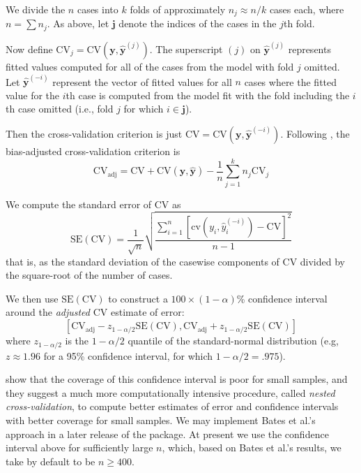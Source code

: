 \documentclass[
]{jss}
\begin{document}
We divide the \(n\) cases into \(k\) folds of approximately
\(n_j \approx n/k\) cases each, where \(n = \sum n_j\). As above, let
\(\mathbf{j}\) denote the indices of the cases in the \(j\)th fold.

Now define
\(\mathrm{CV}_j = \mathrm{CV}(\mathbf{y}, \widehat{\mathbf{y}}^{(j)})\).
The superscript \((j)\) on \(\widehat{\mathbf{y}}^{(j)}\) represents
fitted values computed for all of the cases from the model with fold
\(j\) omitted. Let \(\widehat{\mathbf{y}}^{(-i)}\) represent the vector
of fitted values for all \(n\) cases where the fitted value for the
\(i\)th case is computed from the model fit with the fold including the
\(i\)th case omitted (i.e., fold \(j\) for which \(i \in \mathbf{j}\)).

Then the cross-validation criterion is just
\(\mathrm{CV} = \mathrm{CV}(\mathbf{y}, \widehat{\mathbf{y}}^{(-i)})\).
Following \citet[pp.~293--295]{DavisonHinkley:1997}, the bias-adjusted
cross-validation criterion is \[
\mathrm{CV}_{\mathrm{adj}} = \mathrm{CV} + \mathrm{CV}(\mathbf{y}, \widehat{\mathbf{y}}) - \frac{1}{n} \sum_{j=1}^{k} n_j \mathrm{CV}_j
\]

We compute the standard error of CV as \[
\mathrm{SE}(\mathrm{CV}) = \frac{1}{\sqrt n} \sqrt{ \frac{\sum_{i=1}^n \left[ \mathrm{cv}(y_i, \widehat{y}_i^{(-i)} ) - \mathrm{CV} \right]^2 }{n - 1} }
\] that is, as the standard deviation of the casewise components of CV
divided by the square-root of the number of cases.

We then use \(\mathrm{SE}(\mathrm{CV})\) to construct a
\(100 \times (1 - \alpha)\)\% confidence interval around the
\emph{adjusted} CV estimate of error: \[
\left[ \mathrm{CV}_{\mathrm{adj}} - z_{1 - \alpha/2}\mathrm{SE}(\mathrm{CV}), \mathrm{CV}_{\mathrm{adj}} + z_{1 - \alpha/2}\mathrm{SE}(\mathrm{CV})  \right]
\] where \(z_{1 - \alpha/2}\) is the \(1 - \alpha/2\) quantile of the
standard-normal distribution (e.g, \(z \approx 1.96\) for a 95\%
confidence interval, for which \(1 - \alpha/2 = .975\)).

\citet{BatesHastieTibshirani:2023} show that the coverage of this
confidence interval is poor for small samples, and they suggest a much
more computationally intensive procedure, called \emph{nested
cross-validation}, to compute better estimates of error and confidence
intervals with better coverage for small samples. We may implement Bates
et al.'s approach in a later release of the  package. At present
we use the confidence interval above for sufficiently large \(n\),
which, based on Bates et al.'s results, we take by default to be
\(n \ge 400\).


\end{document}
